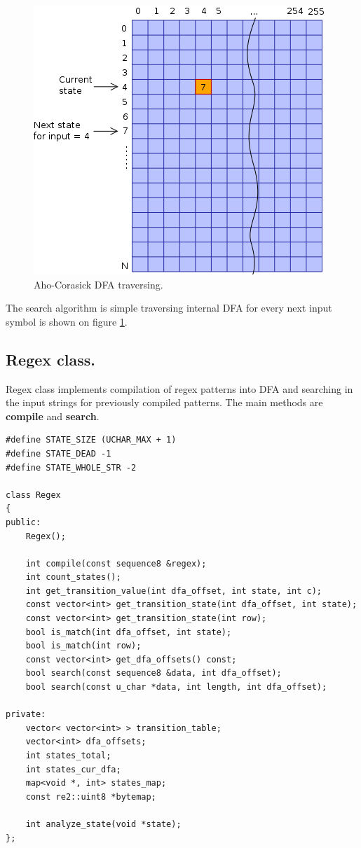 \documentclass[thesis=M,english]{FITthesis}[2011/07/15]
\begin{document}
\begin{figure}[h]
\centering
\includegraphics[scale=0.5]{images/ac_grid.png}
\caption{Aho-Corasick DFA traversing.}
\label{fig:ac_grid}
\end{figure}

The search algorithm is simple traversing internal DFA for every next input symbol is shown on figure \ref{fig:ac_grid}.

\subsection{Regex class.}
Regex class implements compilation of regex patterns into DFA and searching in the input strings for previously compiled patterns. The main methods are \textbf{compile} and \textbf{search}.

\begin{lstlisting}
#define STATE_SIZE (UCHAR_MAX + 1)
#define STATE_DEAD -1
#define STATE_WHOLE_STR -2

class Regex
{
public:
    Regex();

    int compile(const sequence8 &regex);
    int count_states();
    int get_transition_value(int dfa_offset, int state, int c);
    const vector<int> get_transition_state(int dfa_offset, int state);
    const vector<int> get_transition_state(int row);
    bool is_match(int dfa_offset, int state);
    bool is_match(int row);
    const vector<int> get_dfa_offsets() const;
    bool search(const sequence8 &data, int dfa_offset);
    bool search(const u_char *data, int length, int dfa_offset);

private:
    vector< vector<int> > transition_table;
    vector<int> dfa_offsets;
    int states_total;
    int states_cur_dfa;
    map<void *, int> states_map;
    const re2::uint8 *bytemap;

    int analyze_state(void *state);
};
\end{lstlisting}
\end{document}

